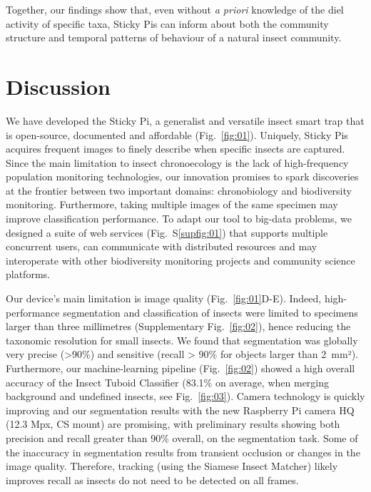 \documentclass[12pt]{article}
\begin{document}
\begin{linenumbers}
		Together, our findings show that, even without \emph{a priori} knowledge of the diel activity of specific taxa, Sticky Pis can inform about both the community structure and temporal patterns of behaviour of a natural insect community.
		
		\section*{Discussion}
		
		
		We have developed the Sticky Pi, a generalist and versatile insect smart trap that is open-source, documented and affordable (Fig.~\ref{fig:01}). Uniquely, Sticky Pis acquires frequent images to finely describe when specific insects are captured. Since the main limitation to insect chronoecology is the lack of high-frequency population monitoring technologies\cite{dominoni_methods_2017}, our innovation promises to spark discoveries at the frontier between two important domains: chronobiology and biodiversity monitoring. Furthermore, taking multiple images of the same specimen may improve classification performance. To adapt our tool to big-data problems, we designed a suite of web services (Fig.~S\ref{supfig:01}) that supports multiple concurrent users, can communicate with distributed resources and may interoperate with other biodiversity monitoring projects and community science platforms\cite{pocock_chapter_2018}.
		
		Our device’s main limitation is image quality (Fig.~\ref{fig:01}D-E). Indeed, high-performance segmentation and classification of insects were limited to specimens larger than three millimetres (Supplementary Fig.~\ref{fig:02}), hence reducing the taxonomic resolution for small insects. 
		We found that segmentation was globally very precise (>90\%) and sensitive (recall > 90\% for objects larger than 2~mm²). Furthermore, our machine-learning pipeline (Fig.~\ref{fig:02}) showed a high overall accuracy of the Insect Tuboid Classifier (83.1\% on average, when merging background and undefined insects, see Fig.~\ref{fig:03}). 
		Camera technology is quickly improving and our segmentation results with the new Raspberry Pi camera HQ (12.3 Mpx, CS mount) are promising, with preliminary results showing both precision and recall greater than 90\% overall, on the segmentation task.
		Some of the inaccuracy in segmentation results from transient occlusion or changes in the image quality. 
		Therefore, tracking (using the Siamese Insect Matcher) likely improves recall as insects do not need to be detected on all frames.
		

\end{linenumbers}
\end{document}
